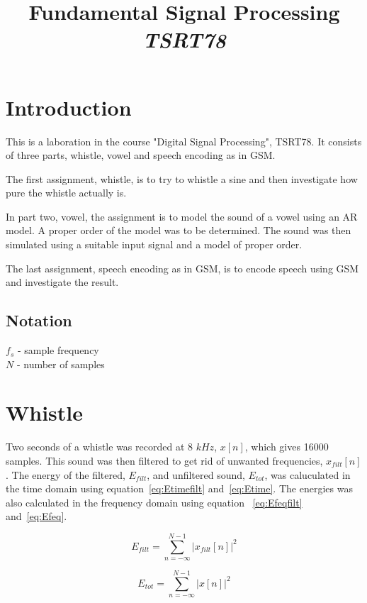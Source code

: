 \documentclass[10pt]{article}
\title{Fundamental Signal Processing\\
\emph{TSRT78}}
\begin{document}
\maketitle

\newpage
\tableofcontents
\newpage

\section{Introduction}
This is a laboration in the course "Digital Signal Processing", TSRT78.
It consists of three parts, whistle, vowel and speech encoding as in GSM.

The first assignment, whistle, is to try to whistle a sine and then
investigate how pure the whistle actually is.

In part two, vowel, the assignment is to model the sound of a vowel
using an AR model. A proper order of the model was to be determined.
The sound was then simulated using a suitable input signal and a
model of proper order.

The last assignment, speech encoding as in GSM, is to encode speech
using GSM and investigate the result.

\subsection{Notation}
$f_s$ - sample frequency\\
$N$ - number of samples

\section{Whistle}
Two seconds of a whistle was recorded at 8 $kHz$, $x[n]$, which gives 16000 samples.
This sound was then filtered to get rid of unwanted frequencies, $x_{filt}[n]$.
The energy of the filtered, $E_{filt}$, and unfiltered sound, $E_{tot}$,
was caluculated in the time domain using equation~\ref{eq:Etimefilt}
and~\ref{eq:Etime}. The energies was also calculated in the frequency
domain using equation ~\ref{eq:Efeqfilt} and~\ref{eq:Efeq}.

\begin{equation}
  \label{eq:Etimefilt}
  E_{filt} =\sum\limits_{n=-\infty}^{N-1} |x_{filt}[n]|^2
\end{equation}

\begin{equation}
  \label{eq:Etime}
  E_{tot} =\sum\limits_{n=-\infty}^{N-1} |x[n]|^2
\end{equation}
\end{document}
